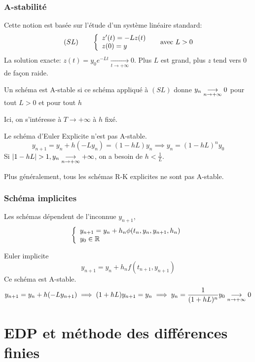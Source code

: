\documentclass[]{report}
\begin{document}
    \subsection{A-stabilité}

    Cette notion est basée sur l'étude d'un système linéaire standard:
    \[(SL)\qquad \left\{\begin{array}{ll} z'(t)=-Lz(t)\\z(0)=y \end{array} \right.\quad \text{ avec $L>0$}\]
    La solution exacte: $z(t)=y_0e^{-Lt}\underset{t\to +\infty}{\longrightarrow} 0$. Plus $L$ est grand, plus $z$ tend vers $0$ de façon raide.

    \begin{df}{}{}
        Un schéma est A-stable si ce schéma appliqué à $(SL)$ donne $y_n\underset{n\to +\infty}{\longrightarrow} 0$ pour tout $L>0$ et pour tout $h$
    \end{df}

    \begin{re}{}{}
        Ici, on s'intéresse à $T\to +\infty$ à $h$ fixé.
    \end{re}

    \begin{ex}{}{}
        Le schéma d'Euler Explicite n'est pas A-stable.
        \[y_{n+1}=y_n+h(-L y_n)=(1-hL)y_n\implies y_n=(1-hL)^n y_0\]
        Si $|1-hL|>1, y_n\toninfty +\infty$, on a besoin de $h<\frac{1}{L}$.
    \end{ex}

    Plus généralement, tous les schémas R-K explicites ne sont pas A-stable.

    \subsection{Schéma implicites}

    Les schémas dépendent de l'inconnue $y_{n+1}$,
    \[\left\{\begin{array}{ll} y_{n+1}=y_n+h_n\phi (t_n,y_n,y_{n+1},h_n)\\ y_0\in \mathbb{R} \end{array} \right.\]

    \begin{ex}{Euler implicite}{}
        \[y_{n+1}=y_n+h_n f(t_{n+1},y_{n+1})\]
        Ce schéma est A-stable.
        \[y_{n+1}=y_n+h(-Ly_{n+1})\implies (1+hL)y_{n+1}=y_n\implies y_n=\frac{1}{(1+hL)^n}y_0\underset{n\to +\infty}{\longrightarrow} 0\]
    \end{ex}

    \chapter{EDP et méthode des différences finies}
\end{document}

